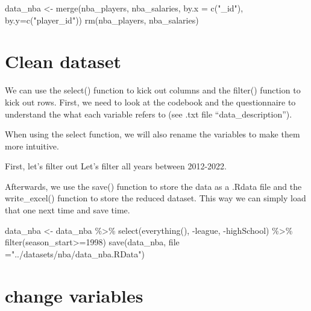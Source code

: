 \documentclass[
]{book}
\newenvironment{Shaded}{\begin{snugshade}}{\end{snugshade}}
\newcommand{\AttributeTok}[1]{\textcolor[rgb]{0.77,0.63,0.00}{#1}}
\newcommand{\AttributeTok}[1]{\textcolor[rgb]{0.13,0.29,0.53}{#1}}
\newcommand{\DecValTok}[1]{\textcolor[rgb]{0.00,0.00,0.81}{#1}}
\newcommand{\FunctionTok}[1]{\textcolor[rgb]{0.00,0.00,0.00}{#1}}
\newcommand{\FunctionTok}[1]{\textcolor[rgb]{0.13,0.29,0.53}{\textbf{#1}}}
\newcommand{\NormalTok}[1]{#1}
\newcommand{\OtherTok}[1]{\textcolor[rgb]{0.56,0.35,0.01}{#1}}
\newcommand{\SpecialCharTok}[1]{\textcolor[rgb]{0.00,0.00,0.00}{#1}}
\newcommand{\SpecialCharTok}[1]{\textcolor[rgb]{0.81,0.36,0.00}{\textbf{#1}}}
\newcommand{\StringTok}[1]{\textcolor[rgb]{0.31,0.60,0.02}{#1}}
\begin{document}
\begin{Shaded}
\begin{Highlighting}[]
\NormalTok{data\_nba }\OtherTok{\textless{}{-}} \FunctionTok{merge}\NormalTok{(nba\_players, nba\_salaries, }\AttributeTok{by.x =} \FunctionTok{c}\NormalTok{(}\StringTok{"\_id"}\NormalTok{), }\AttributeTok{by.y=}\FunctionTok{c}\NormalTok{(}\StringTok{"player\_id"}\NormalTok{))}
\FunctionTok{rm}\NormalTok{(nba\_players, nba\_salaries)}
\end{Highlighting}
\end{Shaded}

\hypertarget{clean-dataset}{%
\section{Clean dataset}\label{clean-dataset}}

We can use the select() function to kick out columns and the filter() function to kick out rows. First, we need to look at the codebook and the questionnaire to understand the what each variable refers to (see .txt file ``data\_description'').

When using the select function, we will also rename the variables to make them more intuitive.

First, let's filter out Let's filter all years between 2012-2022.

Afterwards, we use the save() function to store the data as a .Rdata file and the write\_excel() function to store the reduced dataset. This way we can simply load that one next time and save time.

\begin{Shaded}
\begin{Highlighting}[]
\NormalTok{data\_nba }\OtherTok{\textless{}{-}}\NormalTok{ data\_nba }\SpecialCharTok{\%\textgreater{}\%}
        \FunctionTok{select}\NormalTok{(}\FunctionTok{everything}\NormalTok{(), }\SpecialCharTok{{-}}\NormalTok{league, }\SpecialCharTok{{-}}\NormalTok{highSchool) }\SpecialCharTok{\%\textgreater{}\%}
        \FunctionTok{filter}\NormalTok{(season\_start}\SpecialCharTok{\textgreater{}=}\DecValTok{1998}\NormalTok{)}
\FunctionTok{save}\NormalTok{(data\_nba, }\AttributeTok{file =}\StringTok{"../datasets/nba/data\_nba.RData"}\NormalTok{)}
\end{Highlighting}
\end{Shaded}

\hypertarget{change-variables}{%
\section{change variables}\label{change-variables}}
\end{document}
